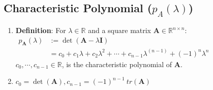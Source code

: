 \subsection{Characteristic Polynomial ($p_A(\lambda)$)}

\begin{enumerate}
    \item \textbf{Definition}: For $\lambda \in \mathbb{R}$ and a square matrix $\bm{A} \in \mathbb{R}^{n\times n}$:
    \\
    $
        \begin{aligned}
            p_{\bm{A}}(\lambda ) &:= \det(\bm{A} - \lambda \bm{I}) \\
            &= c_0 + c_1\lambda  + c_2\lambda  ^2 + \cdots + c_{n-1}\lambda ^{( n-1)} + (-1)^n\lambda^  n
        \end{aligned}
    $
    \\
    $c_0, \cdots , c_{n-1} \in \mathbb{R}$, is the characteristic polynomial of $\bm{A}$.

    \item $c_0 = \det(\bm{A}), c_{n-1} = (-1)^{n-1}\ tr(\bm{A})$
\end{enumerate}









